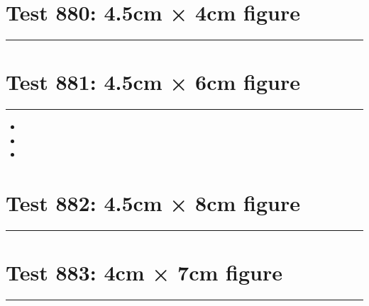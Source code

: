 \documentclass[a4paper,11pt]{article}
\begin{document}
\section*{Test 880: 4.5cm × 4cm figure}
\begin{swarmwrap}%
  \begin{minipage}[t]{4cm}
    \centering
    \rule{\linewidth}{4cm}
  \end{minipage}%
\end{swarmwrap}%
\swarmwrapnext
\lipsum[80]
\lipsum[81]
\lipsum[82]
\lipsum[83]
\lipsum[84]
\lipsum[85]
\section*{Test 881: 4.5cm × 6cm figure}
\begin{swarmwrap}%
  \begin{minipage}[t]{4cm}
    \centering
    \rule{\linewidth}{6cm}
  \end{minipage}%
\end{swarmwrap}%
\swarmwrapnext
\lipsum[46]
\begin{itemize}
  \item \lipsum[47][1-3]
  \item \lipsum[48][1-3]
  \item \lipsum[49][1-3]
\end{itemize}
\section*{Test 882: 4.5cm × 8cm figure}
\begin{swarmwrap}%
  \begin{minipage}[t]{4cm}
    \centering
    \rule{\linewidth}{8cm}
  \end{minipage}%
\end{swarmwrap}%
\swarmwrapnext
\lipsum[48]
\lipsum[49]
\lipsum[50]
\section*{Test 883: 4cm × 7cm figure}
\begin{swarmwrap}%
  \begin{minipage}[t]{4cm}
    \centering
    \rule{\linewidth}{7cm}
  \end{minipage}%
\end{swarmwrap}%
\swarmwrapnext
\lipsum[146]
\lipsum[147]
\lipsum[148]
\lipsum[149]
\end{document}

